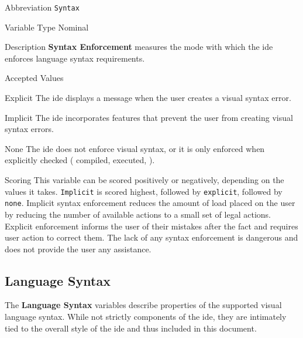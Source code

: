\begin{AlignedDesc}
  \item[Abbreviation] \texttt{Syntax}

  \item[Variable Type] Nominal

  \item[Description] \textbf{Syntax Enforcement} measures the mode with
  which the \ac{ide} enforces language syntax requirements.

  \item[Accepted Values]

  \begin{AlignedDesc}
    \item[Explicit] The \ac{ide} displays a message when the user creates a
    visual syntax error.
    \item[Implicit] The \ac{ide} incorporates features that prevent the
    user from creating visual syntax errors.
    \item[None] The \ac{ide} does not enforce visual syntax, or it is only
    enforced when explicitly checked (\eg{} compiled, executed, \etc).
  \end{AlignedDesc}

  \item[Scoring] This variable can be scored positively or negatively,
  depending on the values it takes. \texttt{Implicit} is scored highest,
  followed by \texttt{explicit}, followed by \texttt{none}. Implicit syntax
  enforcement reduces the amount of load placed on the user by reducing the
  number of available actions to a small set of legal actions. Explicit
  enforcement informs the user of their mistakes after the fact and
  requires user action to correct them. The lack of any syntax enforcement
  is dangerous and does not provide the user any assistance.

\end{AlignedDesc}


\subsection{Language Syntax}
\label{subsec:languagesyntax}

The \textbf{Language Syntax} variables describe properties of the supported
visual language syntax. While not strictly components of the \ac{ide}, they
are intimately tied to the overall style of the \ac{ide} and thus
included in this document.

